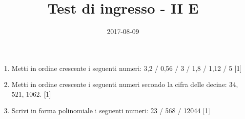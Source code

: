 \documentclass[11pt,fleqn]{article} %
\title{Test di ingresso - II E}
\date{2017-08-09}
\begin{document}
\maketitle
\begin{enumerate}

\item Metti in ordine crescente i seguenti numeri: 3,2 / 0,56 / 3 / 1,8 / 1,12 / 5 [1] 
\item Metti in ordine crescente i seguenti numeri secondo la cifra delle decine: 34, 521, 1062. [1] 
\item Scrivi in forma polinomiale i seguenti numeri: 23 / 568 / 12044 [1] 
\end{enumerate}
\end{document}

